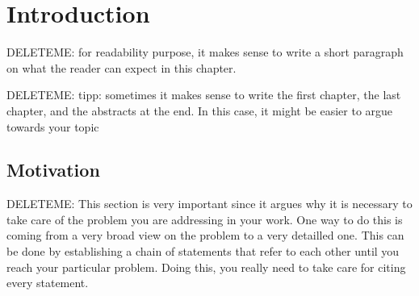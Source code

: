 \chapter{Introduction}
\label{introduction}
DELETEME: for readability purpose, it makes sense to write a short paragraph on what the reader can expect in this chapter.

DELETEME: tipp: sometimes it makes sense to write the first chapter, the last chapter, and the abstracts at the end. In this case, it might be easier to argue towards your topic

\section{Motivation}
DELETEME: This section is very important since it argues why it is necessary to take care of the problem you are addressing in your work. One way to do this is coming from a very broad view on the problem to a very detailled one. This can be done by establishing a chain of statements that refer to each other until you reach your particular problem. Doing this, you really need to take care for citing every statement. 

